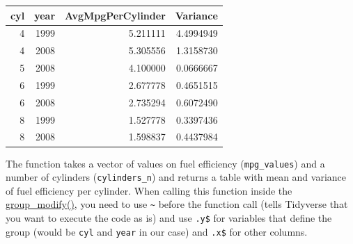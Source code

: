 \documentclass[
]{book}
\newenvironment{Shaded}{\begin{snugshade}}{\end{snugshade}}
\newcommand{\AttributeTok}[1]{\textcolor[rgb]{0.77,0.63,0.00}{#1}}
\newcommand{\ControlFlowTok}[1]{\textcolor[rgb]{0.13,0.29,0.53}{\textbf{#1}}}
\newcommand{\FunctionTok}[1]{\textcolor[rgb]{0.00,0.00,0.00}{#1}}
\newcommand{\NormalTok}[1]{#1}
\newcommand{\OtherTok}[1]{\textcolor[rgb]{0.56,0.35,0.01}{#1}}
\newcommand{\SpecialCharTok}[1]{\textcolor[rgb]{0.00,0.00,0.00}{#1}}
\begin{document}
\begin{Shaded}
\end{Shaded}

\begin{tabular}{r|r|r|r}
\hline
cyl & year & AvgMpgPerCylinder & Variance\\
\hline
4 & 1999 & 5.211111 & 4.4994949\\
\hline
4 & 2008 & 5.305556 & 1.3158730\\
\hline
5 & 2008 & 4.100000 & 0.0666667\\
\hline
6 & 1999 & 2.677778 & 0.4651515\\
\hline
6 & 2008 & 2.735294 & 0.6072490\\
\hline
8 & 1999 & 1.527778 & 0.3397436\\
\hline
8 & 2008 & 1.598837 & 0.4437984\\
\hline
\end{tabular}

The function takes a vector of values on fuel efficiency (\texttt{mpg\_values}) and a number of cylinders (\texttt{cylinders\_n}) and returns a table with mean and variance of fuel efficiency per cylinder. When calling this function inside the \href{https://dplyr.tidyverse.org/reference/group_map.html}{group\_modify()}, you need to use \texttt{\textasciitilde{}} before the function call (tells Tidyverse that you want to execute the code as is) and use \texttt{.y\$} for variables that define the group (would be \texttt{cyl} and \texttt{year} in our case) and \texttt{.x\$} for other columns.
\end{document}
